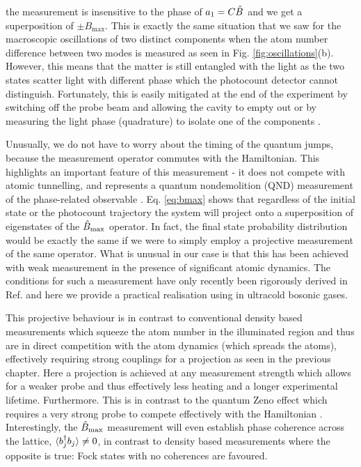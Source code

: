 the measurement is insensitive to the phase of $a_1 = C \hat{B}$ and we
get a superposition of $\pm B_\mathrm{max}$. This is exactly the same
situation that we saw for the macroscopic oscillations of two distinct
components when the atom number difference between two modes is
measured as seen in Fig. \ref{fig:oscillations}(b). However, this
means that the matter is still entangled with the light as the two
states scatter light with different phase which the photocount
detector cannot distinguish. Fortunately, this is easily mitigated at
the end of the experiment by switching off the probe beam and allowing
the cavity to empty out or by measuring the light phase (quadrature)
to isolate one of the components \cite{mekhov2009pra, mekhov2012,
  atoms2015}.

Unusually, we do not have to worry about the timing of the quantum
jumps, because the measurement operator commutes with the
Hamiltonian. This highlights an important feature of this measurement
- it does not compete with atomic tunnelling, and represents a quantum
nondemolition (QND) measurement of the phase-related observable
\cite{brune1992}. Eq. \eqref{eq:bmax} shows that regardless of the
initial state or the photocount trajectory the system will project
onto a superposition of eigenstates of the $\hat{B}_\mathrm{max}$ operator. In fact,
the final state probability distribution would be exactly the same if
we were to simply employ a projective measurement of the same
operator. What is unusual in our case is that this has been achieved
with weak measurement in the presence of significant atomic
dynamics. The conditions for such a measurement have only recently
been rigorously derived in Ref. \cite{weinberg2016} and here we
provide a practical realisation using in ultracold bosonic gases.

This projective behaviour is in contrast to conventional density based
measurements which squeeze the atom number in the illuminated region
and thus are in direct competition with the atom dynamics (which
spreads the atoms), effectively requiring strong couplings for a
projection as seen in the previous chapter. Here a projection is
achieved at any measurement strength which allows for a weaker probe
and thus effectively less heating and a longer experimental
lifetime. Furthermore. This is in contrast to the quantum Zeno effect
which requires a very strong probe to compete effectively with the
Hamiltonian \cite{misra1977, facchi2008, raimond2010, raimond2012,
  signoles2014}. Interestingly, the $\hat{B}_\mathrm{max}$ measurement will even
establish phase coherence across the lattice,
$\langle b^\dagger_j b_j \rangle \ne 0$, in contrast to density based
measurements where the opposite is true: Fock states with no
coherences are favoured.

